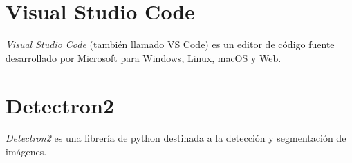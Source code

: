 \section{Visual Studio Code}
\textit{Visual Studio Code} (también llamado VS Code) es un editor de código fuente desarrollado por Microsoft para Windows, Linux, macOS y Web. \cite{wiki:visualstudiocode}

\section{Detectron2}
\textit{Detectron2} es una librería de python destinada a la detección y segmentación de imágenes. 